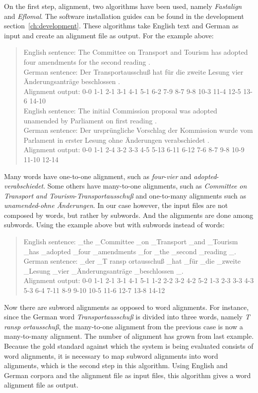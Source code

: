 On the first step, alignment, two algorithms have been used, namely \emph{Fastalign} and \emph{Eflomal}. The software installation guides can be found in the development section~\ref{ch:development}. These algorithms take English text and German as input and create an alignment file as output. For the example above:

\begin{quote}
	English sentence: The Committee on Transport and Tourism has adopted four amendments for the second reading .\\
	German sentence: Der Transportausschuß hat für die zweite Lesung vier Änderungsanträge beschlossen .\\
	Alignment output: 0-0 1-1 2-1 3-1 4-1 5-1 6-2 7-9 8-7 9-8 10-3 11-4 12-5 13-6 14-10\\

	English sentence: The initial Commission proposal was adopted unamended by Parliament on first reading .\\
	German sentence: Der ursprüngliche Vorschlag der Kommission wurde vom Parlament in erster Lesung ohne Änderungen verabschiedet .\\
	Alignment output: 0-0 1-1 2-4 3-2 3-3 4-5 5-13 6-11 6-12 7-6 8-7 9-8 10-9 11-10 12-14
\end{quote}

\clearpage
Many words have one-to-one alignment, such as \emph{four}-\emph{vier} and \emph{adopted}-\emph{verabschiedet}. Some others have many-to-one alignments, such as \emph{Committee on Transport and Tourism}-\emph{Transportausschuß} and one-to-many alignments such as \emph{unamended}-\emph{ohne Änderungen}. In our case however, the input files are not composed by words, but rather by subwords. And the alignments are done among subwords. Using the example above but with subwords instead of words:

\begin{quote}
	English sentence: \_the \_Committee \_on \_Transport \_and \_Tourism \_has \_adopted \_four \_amendments \_for \_the \_second \_reading \_.\\
	German sentence: \_der \_T ransp ortausschuß \_hat \_für \_die \_zweite \_Lesung \_vier \_Änderungsanträge \_beschlossen \_.\\
	Alignment output: 0-0 1-1 2-1 3-1 4-1 5-1 1-2 2-2 3-2 4-2 5-2 1-3 2-3 3-3 4-3 5-3 6-4 7-11 8-9 9-10 10-5 11-6 12-7 13-8 14-12
\end{quote}

Now there are subword alignments as opposed to word alignments. For instance, since the German word \emph{Transportausschuß} is divided into three words, namely \emph{T ransp ortausschuß}, the many-to-one alignment from the previous case is now a many-to-many alignment. The number of alignment has grown from last example. Because the gold standard against which the system is being evaluated consists of word alignments, it is necessary to map subword alignments into word alignments, which is the second step in this algorithm. Using English and German corpora and the alignment file as input files, this algorithm gives a word alignment file as output.

